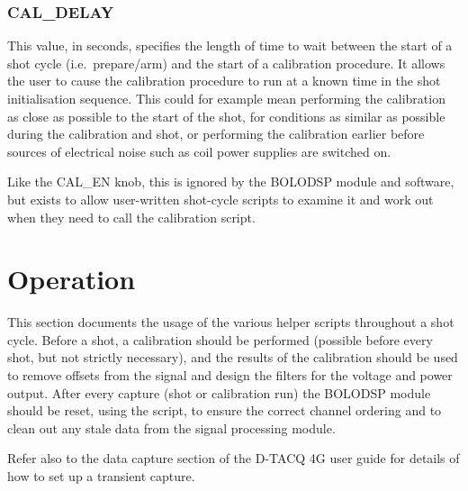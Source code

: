 \documentclass[12pt,a4paper]{article}
\begin{document}
\subsubsection{CAL{\_}DELAY}
This value, in seconds, specifies the length of time to wait between the start of a shot cycle (i.e.~prepare/arm) and the start of a calibration
procedure. It allows the user to cause the calibration procedure to run at a known time in the shot initialisation sequence. This could for example mean
performing the calibration as close as possible to the start of the shot, for conditions as similar as possible during the calibration and shot, or
performing the calibration earlier before sources of electrical noise such as coil power supplies are switched on.

Like the CAL{\_}EN knob, this is ignored by the BOLODSP module and software, but exists to allow user-written shot-cycle scripts to examine it and work
out when they need to call the calibration script.

\section{Operation}%
\label{sec:operation}
This section documents the usage of the various helper scripts throughout a shot cycle. Before a shot, a calibration should be performed (possible before
every shot, but not strictly necessary), and the results of the calibration should be used to remove offsets from the signal and design the filters for
the voltage and power output. After every capture (shot or calibration run) the BOLODSP module should be reset, using the
\mbox{} script, to ensure the correct channel ordering and to clean out any stale data from the signal processing
module.

Refer also to the data capture section of the D-TACQ 4G user guide for details of how to set up a transient capture.
\end{document}
